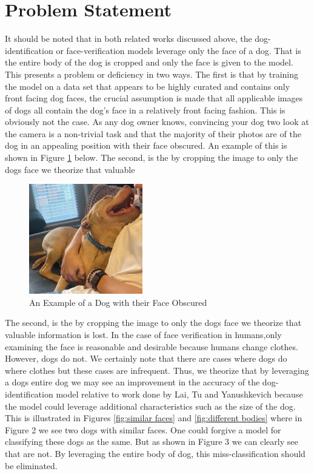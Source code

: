 \documentclass{article}
\begin{document}
\section{Problem Statement}
It should be noted that in both related works discussed above, the dog-identification or face-verification models leverage only the face of a dog.  That is the entire body of the dog is cropped and only the face is given to the model.  This presents a problem or deficiency in two ways.  The first is that by training the model on a data set that appears to be highly curated and contains only front facing dog faces, the crucial assumption is made that all applicable images of dogs all contain the dog's face in a relatively front facing fashion.  This is obviously not the case.  As any dog owner knows, convincing your dog two look at the camera is a non-trivial task and that the majority of their photos are of the dog in an appealing position with their face obscured.  An example of this is shown in Figure \ref{fig:x dog no face} below.  The second, is the by cropping the image to only the dogs face we theorize that valuable 


\begin{figure}[h]
\centering
	\includegraphics{final-report-images/nofacedog.jpg}
\caption{An Example of a Dog with their Face Obscured}
\label{fig:x dog no face}
\end{figure}
The second, is the by cropping the image to only the dogs face we theorize that valuable information is lost.  In the case of face verification in humans,only examining the face is reasonable and desirable because humans change clothes.  However, dogs do not.  We certainly note that there are cases where dogs do where clothes but these cases are infrequent.  Thus, we theorize that by leveraging a dogs entire dog we may see an improvement in the accuracy of the dog-identification model relative to work done by  Lai, Tu and Yanushkevich because the model could leverage additional characteristics such as the size of the dog.  This is illustrated in Figures \ref{fig:similar faces} and \ref{fig:different bodies} where in Figure 2 we see two dogs with similar faces.  One could forgive a model for classifying these dogs as the same.  But as shown in Figure 3 we can clearly see that are not.  By leveraging the entire body of dog, this miss-classification should be eliminated.
\end{document}
